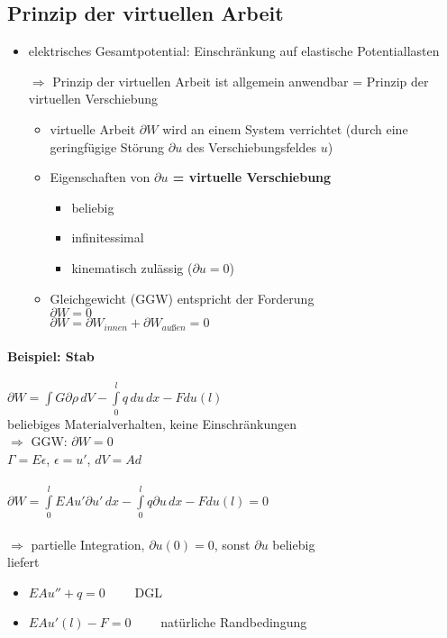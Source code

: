 \subsection{Prinzip der virtuellen Arbeit}
\begin{itemize}
	\item elektrisches Gesamtpotential: Einschränkung auf elastische Potentiallasten
	\item[$\Rightarrow$] Prinzip der virtuellen Arbeit ist allgemein anwendbar = Prinzip der virtuellen Verschiebung
	
	\begin{itemize}
		\item virtuelle Arbeit {\boldmath\(\partial W\)} wird an einem System verrichtet (durch eine geringfügige Störung \(\partial u\) des Verschiebungsfeldes \(u\))
		\item Eigenschaften von \textbf{\boldmath\(\partial u\) = virtuelle Verschiebung}
			\begin{itemize}
				\item beliebig
				\item infinitessimal
				\item kinematisch zulässig (\(\partial u = 0\))
			\end{itemize}
		\item Gleichgewicht (GGW) entspricht der Forderung \\
			\(\partial W = 0\)\\
			\(\partial W = \partial W_{innen} + \partial W_{außen} = 0\)
	\end{itemize}
\end{itemize}
\paragraph{Beispiel: Stab}
	\(\partial W = \int G \partial \rho\,dV - \int\limits_0^l q\,du\,dx - Fdu(l)\)\\
	beliebiges Materialverhalten, keine Einschränkungen\\
	\(\Rightarrow\) GGW: \(\partial W = 0\)\\
	\(\Gamma = E \epsilon\), \(\epsilon = u'\), \(dV = Ad\)\\\\
	{\boldmath\(\partial W = \int\limits_0^l EAu' \partial u'\, dx - \int\limits_0^l q \partial u\, dx - Fdu(l) = 0\)}\\\\
	$\Rightarrow$ partielle Integration, \(\partial u(0) = 0\), sonst \(\partial u\) beliebig\\
	liefert 
	\begin{itemize}
		\item \(E A u'' + q = 0 \qquad\) DGL
		\item \(E A u'(l) -F = 0 \qquad\) natürliche Randbedingung
	\end{itemize}
